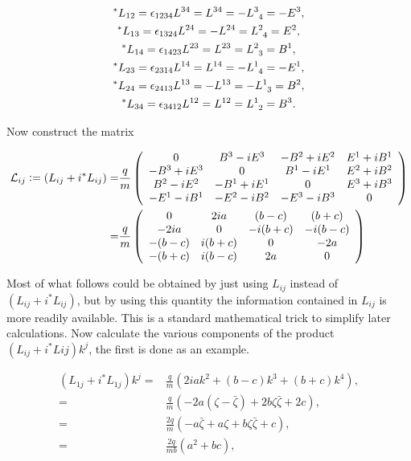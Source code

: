 \begin{gather*}
^*L_{12} = \epsilon_{1234}L^{34} = L^{34} = -\tensor{L}{^3_4} = -E^3, \\
^*L_{13} = \epsilon_{1324}L^{24} = - L^{24} = \tensor{L}{^2_4} = E^2,  \\
^*L_{14} = \epsilon_{1423}L^{23} = L^{23} = \tensor{L}{^2_3} =  B^1, \\
^*L_{23} = \epsilon_{2314}L^{14} = L^{14} = -\tensor{L}{^1_4} = -E^1, \\
^*L_{24} = \epsilon_{2413}L^{13} = -L^{13} =- \tensor{L}{^1_3} =  B^2,\\
^*L_{34} = \epsilon_{3412}L^{12} = L^{12} = \tensor{L}{^1_2} = B^3. \\
\end{gather*}

\noindent Now construct the matrix

\begin{align*}
\mathcal{L}_{ij} \vcentcolon = (L_{ij} + i ^*L_{ij}) = &
\frac{q}{m}
\left(
\begin{array}{cccc}
0           & B^3 - iE^3 & -B^2 + i E^2 & E^1 +iB^1 \\
-B^3+iE^3   & 0          & B^1 - i E^1  & E^2+iB^2 \\
B^2-iE^2    & -B^1 +iE^1 & 0            & E^3+iB^3 \\
-E^1 - iB^1 & -E^2-iB^2  & -E^3-iB^3    & 0        \\
\end{array}
\right) \\
= & 
\frac{q}{m}
\left(
\begin{array}{cccc}
0      & 2ia    & (b-c)   & (b+c)   \\
-2ia   & 0      & -i(b+c) & -i(b-c) \\
-(b-c) & i(b+c) & 0       & -2a     \\
-(b+c) & i(b-c) & 2a      & 0       \\
\end{array}
\right)
\end{align*}

\noindent Most of what follows could be obtained by just using $L_{ij}$ instead of $(L_{ij} + i ^*L_{ij})$, but by using this quantity the information contained in $L_{ij}$ is more readily available. This is a standard mathematical trick to simplify later calculations. Now calculate the various components of the product $(L_{ij} + i ^*L{ij}) k^j$, the first is done as an example. 

\begin{align*}
(L_{1j} + i ^*L_{1j}) k^j = & \frac{q}{m} (2iak^2 + (b-c)k^3 + (b+c)k^4), \\
                         = &\frac{q}{m} (-2a(\zeta - \bar{\zeta}) + 2b\zeta\bar{\zeta} + 2c), \\
                         = &\frac{2q}{m} (-a\bar{\zeta} + a\zeta + b\zeta\bar{\zeta} +c), \\
                         = &\frac{2q}{mb} (a^2 + bc), 
\end{align*}

